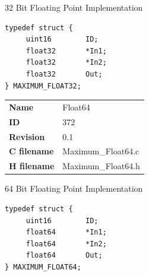 32 Bit Floating Point Implementation

\begin{lstlisting}
typedef struct {
     uint16        ID;
     float32       *In1;
     float32       *In2;
     float32       Out;
} MAXIMUM_FLOAT32;
\end{lstlisting}

\ifdefined \AddTestReports
{}
\fi
{}
\nopagebreak[0]
\begin{tabular}{l l}
\textbf{Name} & Float64 \tabularnewline
\textbf{ID} & 372 \tabularnewline
\textbf{Revision} & 0.1 \tabularnewline
\textbf{C filename} & Maximum\_Float64.c \tabularnewline
\textbf{H filename} & Maximum\_Float64.h \tabularnewline
\end{tabular}
\vspace{1ex}

64 Bit Floating Point Implementation

\begin{lstlisting}
typedef struct {
     uint16        ID;
     float64       *In1;
     float64       *In2;
     float64       Out;
} MAXIMUM_FLOAT64;
\end{lstlisting}

\ifdefined \AddTestReports
{}
\fi
